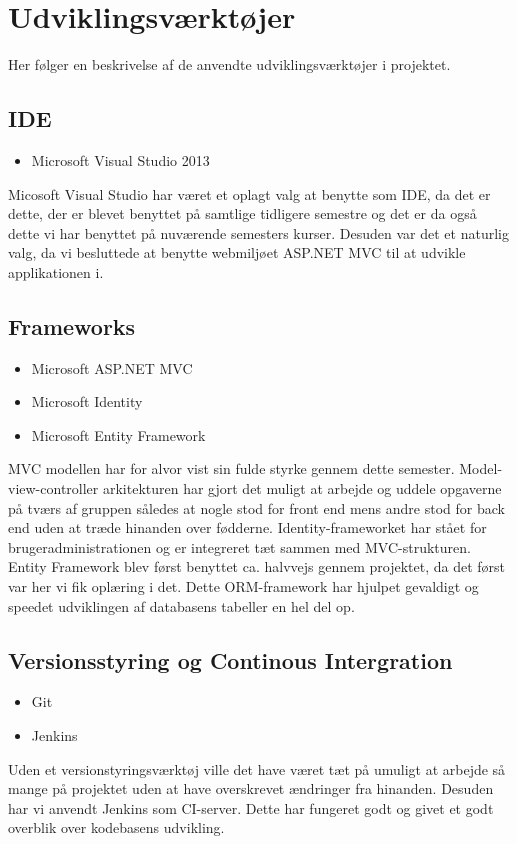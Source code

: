 \section{Udviklingsværktøjer} 

Her følger en beskrivelse af de anvendte udviklingsværktøjer i projektet.

\subsection*{IDE}
\begin{itemize}
  \item Microsoft Visual Studio 2013
\end{itemize}
Micosoft Visual Studio har været et oplagt valg at benytte som IDE, da det er dette, der er blevet benyttet på samtlige tidligere semestre og det er da også dette vi har benyttet på nuværende semesters kurser. Desuden var det et naturlig valg, da vi besluttede at benytte webmiljøet ASP.NET MVC \citep{aspnetmvcWeb} til at udvikle applikationen i.

\subsection*{Frameworks} 
\begin{itemize}
  \item Microsoft ASP.NET MVC
  \item Microsoft Identity
  \item Microsoft Entity Framework
\end{itemize}
MVC modellen har for alvor vist sin fulde styrke gennem dette semester. Model-view-controller arkitekturen har gjort det muligt at arbejde og uddele opgaverne på tværs af gruppen således at nogle stod for front end mens andre stod for back end uden at træde hinanden over fødderne. Identity-frameworket har stået for brugeradministrationen og er integreret tæt sammen med MVC-strukturen.
Entity Framework blev først benyttet ca. halvvejs gennem projektet, da det først var her vi fik oplæring i det. Dette ORM-framework har hjulpet gevaldigt og speedet udviklingen af databasens tabeller en hel del op.  

\subsection*{Versionsstyring og Continous Intergration} 
\begin{itemize}
  \item Git
  \item Jenkins
\end{itemize}
Uden et versionstyringsværktøj ville det have været tæt på umuligt at arbejde så mange på projektet uden at have overskrevet ændringer fra hinanden. Desuden har vi anvendt Jenkins \citep{jenkinsWeb} som CI-server. Dette har fungeret godt og givet et godt overblik over kodebasens udvikling.

